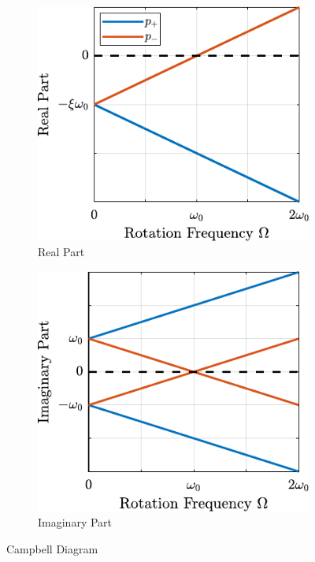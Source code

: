 \documentclass{ISMA_USD2020}
\begin{document}
\begin{figure}[htbp]
\begin{subfigure}[c]{0.4\linewidth}
\includegraphics[width=\linewidth]{figs/campbell_diagram_real.pdf}
\caption{\label{fig:campbell_diagram_real} Real Part}
\end{subfigure}
\begin{subfigure}[c]{0.4\linewidth}
\includegraphics[width=\linewidth]{figs/campbell_diagram_imag.pdf}
\caption{\label{fig:campbell_diagram_imag} Imaginary Part}
\end{subfigure}
\caption{\label{fig:campbell_diagram}Campbell Diagram}
\centering
\end{figure}
\end{document}
